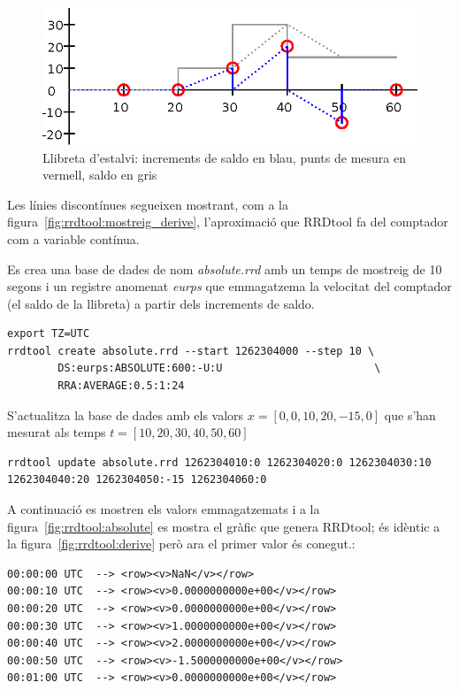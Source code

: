 \begin{figure}[htp]
  \centering
  \includegraphics[width=\textwidth]{imatges/rrdtool/mostreig_absolute.eps}
  \caption{Llibreta d'estalvi: increments de saldo en blau, punts de mesura en vermell, saldo en gris}
  \label{fig:rrdtool:mostreig_absolute}
\end{figure}

Les línies discontínues segueixen mostrant, com a la figura~\ref{fig:rrdtool:mostreig_derive}, l'aproximació que RRDtool fa del comptador com a variable contínua. 


Es crea una base de dades de nom \emph{absolute.rrd} amb un temps de mostreig de 10 segons i un registre anomenat \emph{eurps} que emmagatzema la velocitat del comptador (el saldo de la llibreta) a partir dels increments de saldo. 
\begin{lstlisting}[style=sh]
export TZ=UTC
rrdtool create absolute.rrd --start 1262304000 --step 10 \
        DS:eurps:ABSOLUTE:600:-U:U                        \ 
        RRA:AVERAGE:0.5:1:24                                                   
\end{lstlisting}


S'actualitza la base de dades amb els valors $x=[0,0,10,20,-15,0]$ que s'han mesurat als temps $t=[10,20,30,40,50,60]$ 
\begin{lstlisting}[style=sh]
rrdtool update absolute.rrd 1262304010:0 1262304020:0 1262304030:10 1262304040:20 1262304050:-15 1262304060:0
\end{lstlisting}

A continuació es mostren els valors emmagatzemats i a la figura~\ref{fig:rrdtool:absolute} es mostra el gràfic que genera RRDtool; és idèntic a la figura~\ref{fig:rrdtool:derive} però ara el primer valor és conegut.:
\begin{lstlisting}
00:00:00 UTC  --> <row><v>NaN</v></row>
00:00:10 UTC  --> <row><v>0.0000000000e+00</v></row>
00:00:20 UTC  --> <row><v>0.0000000000e+00</v></row>
00:00:30 UTC  --> <row><v>1.0000000000e+00</v></row>
00:00:40 UTC  --> <row><v>2.0000000000e+00</v></row>
00:00:50 UTC  --> <row><v>-1.5000000000e+00</v></row>
00:01:00 UTC  --> <row><v>0.0000000000e+00</v></row>
\end{lstlisting}


